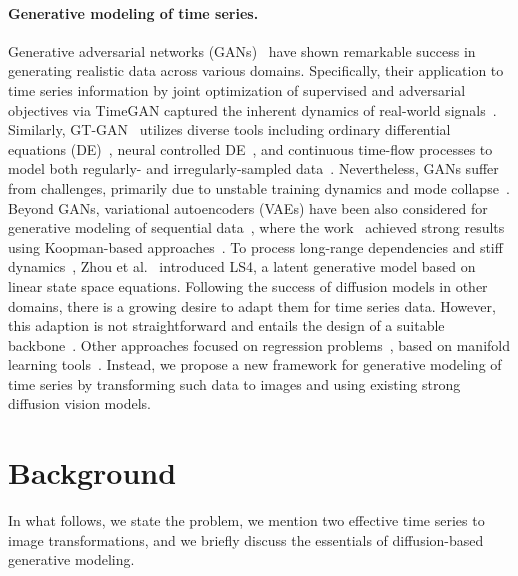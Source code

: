 \documentclass{article}
\begin{document}
\paragraph{Generative modeling of time series.} Generative adversarial networks (GANs)~\cite{goodfellow2014generative} have shown remarkable success in generating realistic data across various domains. Specifically, their application to time series information by joint optimization of supervised and adversarial objectives via TimeGAN captured the inherent dynamics of real-world signals~\cite{yoon2019time}. Similarly, GT-GAN~\cite{jeon2022gt} utilizes diverse tools including ordinary differential equations (DE)~\cite{chen2018neural}, neural controlled DE~\cite{kidger2020neural}, and continuous time-flow processes to model both regularly- and irregularly-sampled data~\cite{deng2020modeling}. Nevertheless, GANs suffer from challenges, primarily due to unstable training dynamics and mode collapse~\cite{lucic2018gans}. Beyond GANs, variational autoencoders (VAEs) have been also considered for generative modeling of sequential data~\cite{desai2021timevae, li2023causal, ren2024learning}, where the work~\cite{naiman2024generative} achieved strong results using Koopman-based approaches~\cite{azencot2019consistent, azencot2020forecasting, naiman2023, berman2023multifactor}. To process long-range dependencies and stiff dynamics~\cite{shampine2007stiff}, Zhou et al.~\cite{zhou2023deep} introduced LS4, a latent generative model based on linear state space equations. Following the success of diffusion models in other domains, there is a growing desire to adapt them for time series data. However, this adaption is not straightforward and entails the design of a suitable backbone~\cite{tashiro2021csdi, lim2023tsgm, coletta2024constrained, yuan2024diffusion, narasimhan2024time}. Other approaches focused on regression problems~\cite{kaufman2024first}, based on manifold learning tools~\cite{kaufman2023data, kaufman2024analyzing}. Instead, we propose a new framework for generative modeling of time series by transforming such data to images and using existing strong diffusion vision models.

    
\section{Background}
\label{sec:background}

In what follows, we state the problem, we mention two effective time series to image transformations, and we briefly discuss the essentials of diffusion-based generative modeling. 
\end{document}
